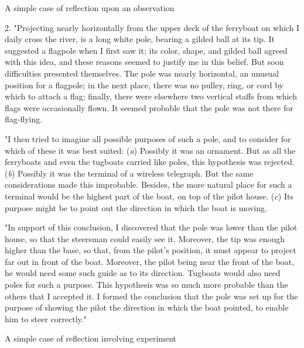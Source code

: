 \documentclass[letterpaper]{book}
\begin{document}
A simple case of reflection upon an observation

2. "Projecting nearly horizontally from the upper deck of the ferryboat
on which I daily cross the river, is a long white pole, bearing a gilded
ball at its tip. It suggested a flagpole when I first saw it; its color,
shape, and gilded ball agreed with this idea, and these reasons seemed
to justify me in this belief. But soon difficulties presented
themselves. The pole was nearly horizontal, an unusual position for a
flagpole; in the next place, there was no pulley, ring, or cord by which
to attach a flag; finally, there were elsewhere two vertical staffs from
which flags were occasionally flown. It seemed probable that the pole
was not there for flag-flying.

"I then tried to imagine all possible purposes of such a pole, and to
consider for which of these it was best suited: (\emph{a}) Possibly it
was an ornament. But as all the ferryboats and even the tugboats carried
like
poles,
this hypothesis was rejected. (\emph{b}) Possibly it was the terminal of
a wireless telegraph. But the same considerations made this improbable.
Besides, the more natural place for such a terminal would be the highest
part of the boat, on top of the pilot house. (\emph{c}) Its purpose
might be to point out the direction in which the boat is moving.

"In support of this conclusion, I discovered that the pole was lower
than the pilot house, so that the steersman could easily see it.
Moreover, the tip was enough higher than the base, so that, from the
pilot's position, it must appear to project far out in front of the
boat. Moreover, the pilot being near the front of the boat, he would
need some such guide as to its direction. Tugboats would also need poles
for such a purpose. This hypothesis was so much more probable than the
others that I accepted it. I formed the conclusion that the pole was set
up for the purpose of showing the pilot the direction in which the boat
pointed, to enable him to steer correctly."

A simple case of reflection involving experiment
\end{document}
